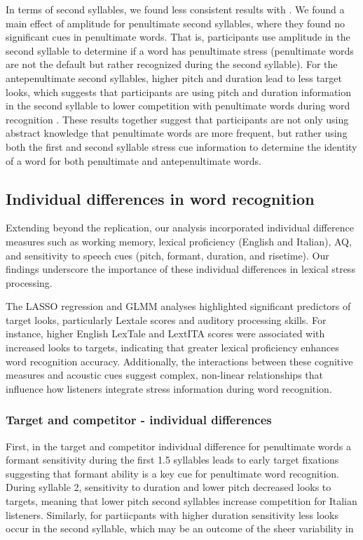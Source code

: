 In terms of second syllables, we found less consistent results with \cite{Sulpizio_McQueen_2012}. We found a main effect of amplitude for penultimate second syllables, where they found no significant cues in penultimate words. That is, participants use amplitude in the second syllable to determine if a word has penultimate stress (penultimate words are not the default but rather recognized during the second syllable). For the antepenultimate second syllables, higher pitch and duration lead to less target looks, which suggests that participants are using pitch and duration information in the second syllable to lower competition with penultimate words during word recognition \cite{McMurray2019}. These results together suggest that participants are not only using abstract knowledge that penultimate words are more frequent, but rather using both the first and second syllable stress cue information to determine the identity of a word for both penultimate and antepenultimate words.

\subsection{Individual differences in word recognition}
Extending beyond the replication, our analysis incorporated individual difference measures such as working memory, lexical proficiency (English and Italian), AQ, and sensitivity to speech cues (pitch, formant, duration, and risetime). Our findings underscore the importance of these individual differences in lexical stress processing.

The LASSO regression and GLMM analyses highlighted significant predictors of target looks, particularly Lextale scores and auditory processing skills. For instance, higher English LexTale and LextITA scores were associated with increased looks to targets, indicating that greater lexical proficiency enhances word recognition accuracy. Additionally, the interactions between these cognitive measures and acoustic cues suggest complex, non-linear relationships that influence how listeners integrate stress information during word recognition.


\subsubsection{Target and competitor - individual differences}
First, in the target and competitor individual difference for penultimate words a formant sensitivity during the first 1.5 syllables leads to early target fixations suggesting that formant ability is a key cue for penultimate word recognition. During syllable 2, sensitivity to duration and lower pitch decreased looks to targets, meaning that lower pitch second syllables increase competition for Italian listeners. Similarly, for partiicpants with higher duration sensitivity less looks occur in the second syllable, which may be an outcome of the sheer variability in  


